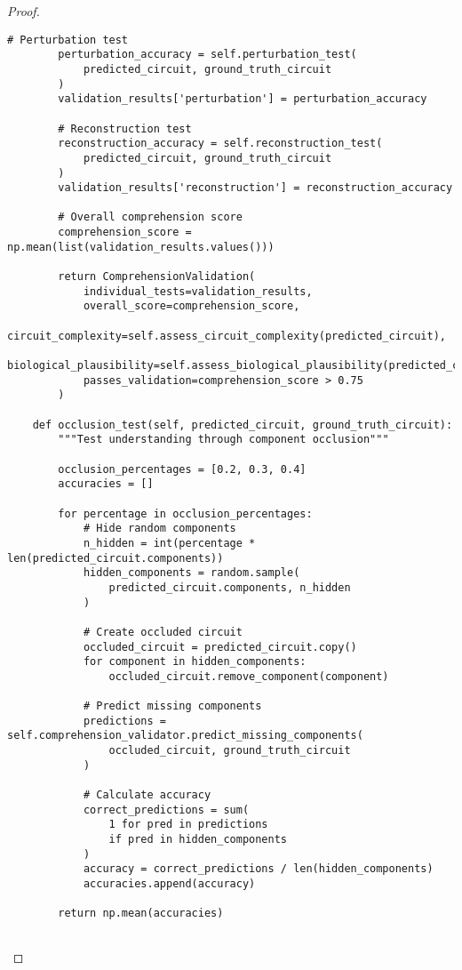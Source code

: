 \documentclass[12pt,a4paper]{article}
\begin{document}
\begin{proof}
\begin{lstlisting}[style=pythonstyle, caption=Visual Understanding Verification Implementation]
        # Perturbation test  
        perturbation_accuracy = self.perturbation_test(
            predicted_circuit, ground_truth_circuit
        )
        validation_results['perturbation'] = perturbation_accuracy
        
        # Reconstruction test
        reconstruction_accuracy = self.reconstruction_test(
            predicted_circuit, ground_truth_circuit
        )
        validation_results['reconstruction'] = reconstruction_accuracy
        
        # Overall comprehension score
        comprehension_score = np.mean(list(validation_results.values()))
        
        return ComprehensionValidation(
            individual_tests=validation_results,
            overall_score=comprehension_score,
            circuit_complexity=self.assess_circuit_complexity(predicted_circuit),
            biological_plausibility=self.assess_biological_plausibility(predicted_circuit),
            passes_validation=comprehension_score > 0.75
        )
        
    def occlusion_test(self, predicted_circuit, ground_truth_circuit):
        """Test understanding through component occlusion"""
        
        occlusion_percentages = [0.2, 0.3, 0.4]
        accuracies = []
        
        for percentage in occlusion_percentages:
            # Hide random components
            n_hidden = int(percentage * len(predicted_circuit.components))
            hidden_components = random.sample(
                predicted_circuit.components, n_hidden
            )
            
            # Create occluded circuit
            occluded_circuit = predicted_circuit.copy()
            for component in hidden_components:
                occluded_circuit.remove_component(component)
            
            # Predict missing components
            predictions = self.comprehension_validator.predict_missing_components(
                occluded_circuit, ground_truth_circuit
            )
            
            # Calculate accuracy
            correct_predictions = sum(
                1 for pred in predictions 
                if pred in hidden_components
            )
            accuracy = correct_predictions / len(hidden_components)
            accuracies.append(accuracy)
        
        return np.mean(accuracies)
        

\end{lstlisting}
\end{proof}
\end{document}
